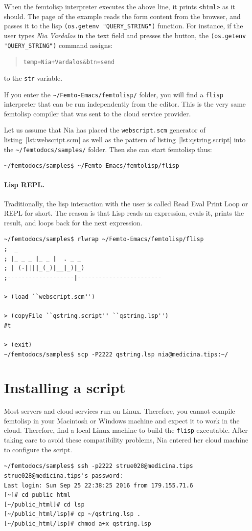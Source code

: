 \documentclass[a4paper,12pt]{book}
\begin{document}
When the femtolisp interpreter executes
the above line, it prints \verb|<html>|
as it should. The page of the example
reads the form content from the browser,
and passes it to
the lisp \verb|(os.getenv "QUERY_STRING")|
function. For instance, if the user
types {\em Nia Vardalos} in the text field
and presses the  button,
the  \verb|(os.getenv "QUERY_STRING")| command
assigns:
\begin{quote}
\verb|temp=Nia+Vardalos&btn=send|
\end{quote}
to the \verb|str| variable.


If you enter the \verb|~/Femto-Emacs/femtolisp/|
folder, you will find a \verb|flisp|
interpreter that can be run independently
from the editor. This is the very same
femtolisp compiler that was sent to
the cloud service provider.

Let us assume that Nia has placed the
\verb|webscript.scm| generator of
listing~\ref{lst:webscript.scm}
as well as the pattern of
listing~\ref{lst:qstring.script}
into the \verb|~/femtodocs/samples/| folder.
Then she can start femtolisp thus:
\begin{verbatim}
~/femtodocs/samples$ ~/Femto-Emacs/femtolisp/flisp
\end{verbatim}

\paragraph{Lisp REPL.} Traditionally, the lisp
interaction with the user is called Read Eval
Print Loop or REPL for short. The reason is that
Lisp reads an expression, evals it, prints the
result, and loops back for the next expression.

\begin{Verbatim}[fontsize=\small,
frame=single,
framerule=0.5mm]
~/femtodocs/samples$ rlwrap ~/Femto-Emacs/femtolisp/flisp
;  _
; |_ _ _ |_ _ |  . _ _
; | (-||||_(_)|__|_)|_)
;-------------------|------------------------

> (load ``webscript.scm'')

> (copyFile ``qstring.script'' ``qstring.lsp'')
#t

> (exit)
~/femtodocs/samples$ scp -P2222 qstring.lsp nia@medicina.tips:~/
\end{Verbatim}

\section{Installing a script}
Most servers and cloud services run on Linux.
Therefore, you cannot compile femtolisp in
your Macintosh or Windows machine and expect it
to work in the cloud. Therefore, find a local
Linux machine to build the \verb|flisp| executable.
After taking care to avoid these compatibility
problems, Nia entered her cloud machine to
configure the script.
\begin{Verbatim}[fontsize=\small,
frame=single,
framerule=0.5mm]
~/femtodocs/samples$ ssh -p2222 strue028@medicina.tips
strue028@medicina.tips's password:
Last login: Sun Sep 25 22:38:25 2016 from 179.155.71.6
[~]# cd public_html
[~/public_html]# cd lsp
[~/public_html/lsp]# cp ~/qstring.lsp .
[~/public_html/lsp]# chmod a+x qstring.lsp
\end{Verbatim}
\end{document}
